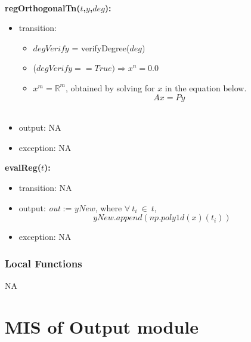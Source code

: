 \documentclass[12pt, titlepage]{article}
\begin{document}
~\newline
~\newline

\noindent \textbf{regOrthogonalTn($t$,$y$,$deg$):}
\begin{itemize}
\item transition: 
\begin{itemize}
	\item $degVerify$ = verifyDegree($deg$)
	\item ($degVerify == True) \Longrightarrow  x ^ n = 0.0$ 
	\item $x ^ m = \mathbb{R}^m$, obtained by solving for $x$ in the 
	equation below.
		\begin{equation*}
		Ax = Py
		\end{equation*}\\
	\end{itemize}	
	\item output: NA
	
	
	\item exception: NA
\end{itemize}


\noindent \textbf{evalReg($t$):}
\begin{itemize}
	\item transition: NA
	\item output: \textit{out} := $yNew$, where
	$ \forall\ t_i\ \in\ t$,  
	\begin{equation*}
	yNew.append(np.poly1d(x)(t_i))
	\end{equation*}
	\item exception: NA
\end{itemize}

\subsubsection{Local Functions}

NA








\section{MIS of Output module} \label{mOutput}
\end{document}
